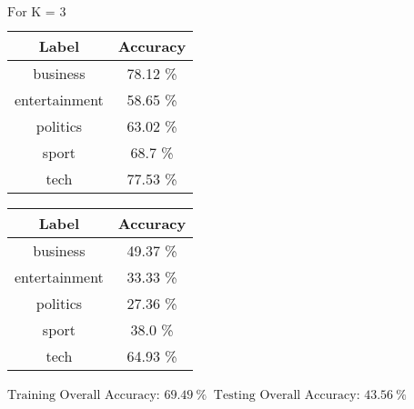 \documentclass[8pt]{extarticle}
\begin{document}
    $\displaystyle \text{For K = }3$
    \begin{center}
        \quad
    \end{center}
    \begin{center}
        \begin{tabular}{cc}
            \hline
            Label & Accuracy\\
            \hline
            business &   78.12 \% \\
       entertainment &   58.65 \% \\
           politics  &   63.02 \% \\
              sport  &   68.7 \% \\
               tech  &   77.53 \%
         \end{tabular}
         \quad
        \begin{tabular}{cc}
            \hline
            Label & Accuracy\\
            \hline
            business &   49.37 \% \\
        entertainment &  33.33 \% \\
           politics  &   27.36 \% \\
              sport  &   38.0  \% \\
               tech  &   64.93 \%
        \end{tabular}
    \end{center}
    \begin{center}
        $\displaystyle \text{Training Overall Accuracy:\ }69.49\ \%$
        $\displaystyle \ \text{Testing Overall Accuracy:\ }43.56\ \%$
    \end{center}
\end{document}
